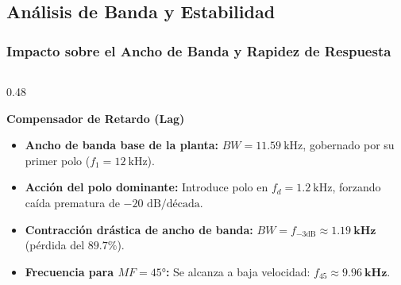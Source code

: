 \subsection{Análisis de Banda y Estabilidad}
\begin{frame}
  \frametitle{Impacto sobre el Ancho de Banda y Rapidez de Respuesta}

  \begin{columns}[t, onlytextwidth]
    \begin{column}{0.48\textwidth}
      \begin{tarjeta}
        {\fontsize{9pt}{11pt}\selectfont \textbf{\color{NavyDark} Compensador de Retardo (Lag)}}\\[2pt]
        {\fontsize{7.5pt}{9.2pt}\selectfont
        \begin{itemize}\setlength{\itemsep}{2.5pt}
          \item \textbf{Ancho de banda base de la planta:}
          $BW = \qty{11.59}{\kilo\hertz}$, gobernado por su primer polo ($f_1 = \qty{12}{\kilo\hertz}$).
          \item \textbf{Acción del polo dominante:}
          Introduce polo en $f_d = \qty{1.2}{\kilo\hertz}$, forzando caída prematura de $-20\text{ dB/década}$.
          \item \textbf{Contracción drástica de ancho de banda:}
          $BW = f_{-3\text{dB}} \approx \mathbf{\qty{1.19}{\kilo\hertz}}$ (pérdida del $\mathbf{89.7\%}$).
          \item \textbf{Frecuencia para $MF = \ang{45}$:}
          Se alcanza a baja velocidad: $f_{45} \approx \mathbf{\qty{9.96}{\kilo\hertz}}$.
        \end{itemize}
        }
      \end{tarjeta}
    \end{column}


\end{columns}
\end{frame}
